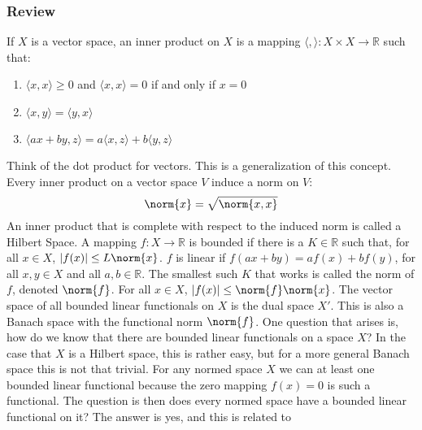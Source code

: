 \documentclass[crop=false,class=book,oneside]{standalone}
\begin{document}
        \subsubsection{Review}
            If $X$ is a vector space, an inner product on
            $X$ is a mapping
            $\langle,\rangle:X\times{X}\rightarrow\mathbb{R}$
            such that:
            \begin{enumerate}
                \item $\langle{x,x}\rangle\geq{0}$ and
                      $\langle{x,x}\rangle=0$ if and only if
                      $x=0$
                \item $\langle{x,y}\rangle=\langle{y,x}\rangle$
                \item $\langle{ax+by,z}\rangle%
                       =a\langle{x,z}\rangle+b\langle{y,z}\rangle$
            \end{enumerate}
            Think of the dot product for vectors. This is a
            generalization of this concept. Every inner product
            on a vector space $V$ induce a norm on $V$:
            \begin{equation*}
                \norm{x}=\sqrt{\norm{x,x}}
            \end{equation*}
            An inner product that is complete with respect to
            the induced norm is called a Hilbert Space. A mapping
            $f:X\rightarrow\mathbb{R}$ is bounded if there is a
            $K\in\mathbb{R}$ such that, for all $x\in{X}$,
            $|f(x)|\leq{L\norm{x}}$. $f$ is linear if
            $f(ax+by)=af(x)+bf(y)$, for all $x,y\in{X}$ and all
            $a,b\in\mathbb{R}$. The smallest such $K$ that works
            is called the norm of $f$, denoted $\norm{f}$. For
            all $x\in{X}$, $|f(x)|\leq\norm{f}\norm{x}$. The
            vector space of all bounded linear functionals on
            $X$ is the dual space $X'$. This is also a Banach
            space with the functional norm $\norm{f}$. One
            question that arises is, how do we know that there
            are bounded linear functionals on a space $X$? In
            the case that $X$ is a Hilbert space, this is rather
            easy, but for a more general Banach space this is not
            that trivial. For any normed space $X$ we can at least
            one bounded linear functional because the zero mapping
            $f(x)=0$ is such a functional. The question is then
            does every normed space have a bounded linear functional
            on it? The answer is yes, and this is related to
\end{document}

